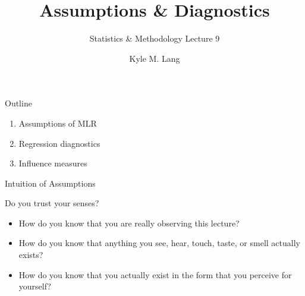 \documentclass{beamer}\usepackage[]{graphicx}\usepackage[]{color}
\title{Assumptions \& Diagnostics}
\subtitle{Statistics \& Methodology Lecture 9}
\author{Kyle M. Lang}
\institute{Department of Methodology \& Statistics\\Tilburg University}
\date{}
\begin{document}
\begin{frame}[t,plain]
\titlepage
\end{frame}


\begin{frame}{Outline}

  \begin{enumerate}
  \item Assumptions of MLR
    \va
  \item Regression diagnostics
    \va
  \item Influence measures
  \end{enumerate}
  
\end{frame}


\begin{frame}{Intuition of Assumptions}

  Do you trust your senses?
  \vc
  \begin{itemize}
  \item How do you know that you are really observing this lecture?
    \vc
  \item How do you know that anything you see, hear, touch, taste, or smell 
    actually exists?
    \vc
  \item How do you know that you actually exist in the form that you perceive 
    for yourself?
  \end{itemize}
  
\end{frame}

\end{document}
